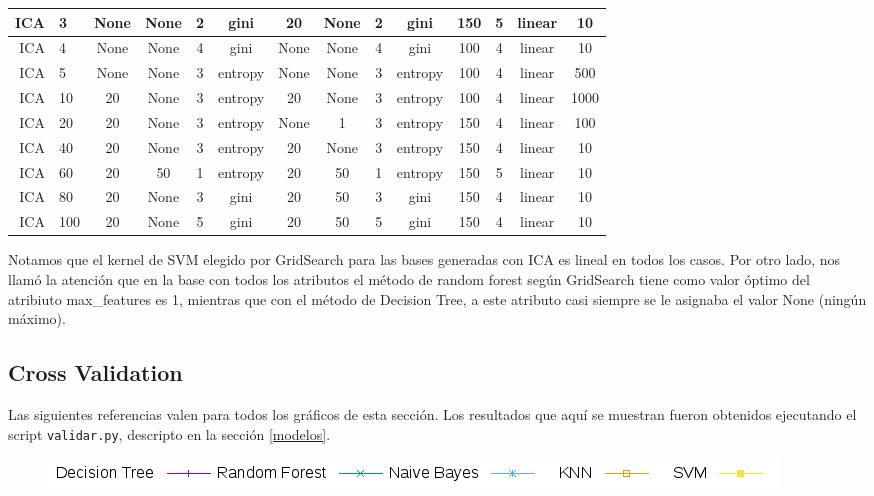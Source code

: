 \documentclass[10pt, a4paper]{article}
\begin{document}
\begin{scriptsize}
\begin{tabular}{|r|l||c|c|c|c||c|c|c|c|c||c||c|c|}
\hline
ICA & 3 & None & None & 2 & gini & 20 & None & 2 & gini & 150 & 5 & linear & 10 \\
\hline
ICA & 4 & None & None & 4 & gini & None & None & 4 & gini & 100 & 4 & linear & 10 \\
\hline
ICA & 5 & None & None & 3 & entropy & None & None & 3 & entropy & 100 & 4 & linear & 500 \\
\hline
ICA & 10 & 20 & None & 3 & entropy & 20 & None & 3 & entropy & 100 & 4 & linear & 1000 \\
\hline
ICA & 20 & 20 & None & 3 & entropy & None & 1 & 3 & entropy & 150 & 4 & linear & 100 \\
\hline
ICA & 40 & 20 & None & 3 & entropy & 20 & None & 3 & entropy & 150 & 4 & linear & 10 \\
\hline
ICA & 60 & 20 & 50 & 1 & entropy & 20 & 50 & 1 & entropy & 150 & 5 & linear & 10 \\
\hline
ICA & 80 & 20 & None & 3 & gini & 20 & 50 & 3 & gini & 150 & 4 & linear & 10 \\
\hline
ICA & 100 & 20 & None & 5 & gini & 20 & 50 & 5 & gini & 150 & 4 & linear & 10 \\
\hline
\end{tabular}
\end{scriptsize}

Notamos que el kernel de SVM elegido por GridSearch para las bases generadas con ICA es lineal en todos los casos.
Por otro lado, nos llamó la atención que en la base con todos los atributos el método de random forest según GridSearch tiene como valor óptimo del atribiuto max\_features es 1, mientras que con el método de Decision Tree, a este atributo casi siempre se le asignaba el valor None (ningún máximo).

\subsection{Cross Validation}

Las siguientes referencias valen para todos los gráficos de esta sección. Los resultados que aquí se muestran fueron obtenidos ejecutando el script \texttt{validar.py}, descripto en la sección \ref{modelos}.

\begin{figure}[H]
\includegraphics[scale=0.6]{../src/data/refs.png}
\end{figure}
\end{document}
